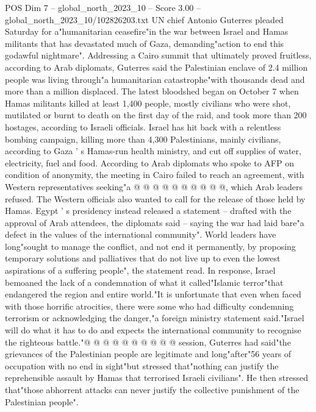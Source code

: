 \begin{textsample}{POS Dim 7 – global\_north\_2023\_10 – Score 3.00 – global\_north\_2023\_10/102826203.txt}  \label{ex:f7_pos_424}
UN chief Antonio Guterres pleaded Saturday for a"humanitarian ceasefire"in the war between Israel and Hamas militants that has devastated much of Gaza, demanding"action to end this godawful nightmare".
Addressing a Cairo summit that ultimately proved fruitless, according to Arab diplomats, Guterres said the Palestinian enclave of 2.4 million people was living through"a humanitarian catastrophe"with thousands dead and more than a million displaced.
The latest bloodshed began on October 7 when Hamas militants killed at least 1,400 people, mostly civilians who were shot, mutilated or burnt to death on the first day of the raid, and took more than 200 hostages, according to Israeli officials.
Israel has hit back with a relentless bombing campaign, killing more than 4,300 Palestinians, mainly civilians, according to Gaza ' s Hamas-run health ministry, and cut off supplies of water, electricity, fuel and food.
According to Arab diplomats who spoke to AFP on condition of anonymity, the meeting in Cairo failed to reach an agreement, with Western representatives seeking"a @ @ @ @ @ @ @ @ @ @, which Arab leaders refused.
The Western officials also wanted to call for the release of those held by Hamas.
Egypt ' s presidency instead released a statement -- drafted with the approval of Arab attendees, the diplomats said -- saying the war had laid bare"a defect in the values of the international community".
World leaders have long"sought to manage the conflict, and not end it permanently, by proposing temporary solutions and palliatives that do not live up to even the lowest aspirations of a suffering people", the statement read.
In response, Israel bemoaned the lack of a condemnation of what it called"Islamic terror"that endangered the region and entire world."It is unfortunate that even when faced with those horrific atrocities, there were some who had difficulty condemning terrorism or acknowledging the danger,"a foreign ministry statement said."Israel will do what it has to do and expects the international community to recognise the righteous battle."@ @ @ @ @ @ @ @ @ @ session, Guterres had said"the grievances of the Palestinian people are legitimate and long"after"56 years of occupation with no end in sight"but stressed that"nothing can justify the reprehensible assault by Hamas that terrorised Israeli civilians".
He then stressed that"those abhorrent attacks can never justify the collective punishment of the Palestinian people".

\end{textsample}
